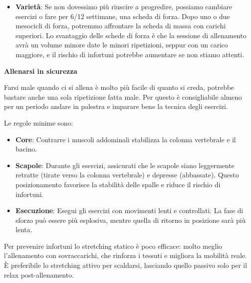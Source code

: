 \documentclass[12pt]{book} %
\begin{document}
\begin{itemize}
Non tutte le progressioni chiaramente sono facili allo stesso modo, nelle alzate laterali è più difficile che sulla pressa. Ad esempio se con le alzate fai 10kg e con la pressa 100kg, aumentare di 1kg o di una ripetizione, nella prima, rappresenterà una percentuale di progressione molto più alta.

Per sapere quando aumentare il carico in palestra, può essere uutile monitorare l'intensità usando il parametro RIR (Reps In Reserve), che misura le ripetizioni che si potrebbero ancora fare a fine serie. Per crescere in maniera sostenibile possiamo tenere 1-2 di RIR. Se il RIR è troppo alto (ad esempio 4-5), lo stimolo è insufficiente e bisogna aumentare il carico; se è costantemente a 0 RIR, si rischia di compromettere il recupero.

\item \textbf{Varietà}:
Se non dovessimo più riuscire a progredire, possiamo cambiare esercizi o fare per 6/12 settimane, una scheda di forza. Dopo uno o due mesocicli di forza, potremmo affrontare la scheda di massa con carichi superiori. Lo svantaggio delle schede di forza è che la sessione di allenamento avrà un volume minore date le minori ripetizioni, seppur con un carico maggiore, e il rischio di infortuni potrebbe aumentare se non stiamo attenti.
\end{itemize}

\textbf{Allenarsi in sicurezza}

Farsi male quando ci si allena è molto più facile di quanto si creda, potrebbe bastare anche una sola ripetizione fatta male. Per questo è consigliabile almeno per un periodo andare in palestra e imparare bene la tecnica degli esercizi.

Le regole minime sono:
\begin{itemize}
\item \textbf{Core}: Contrarre i muscoli addominali stabilizza la colonna vertebrale e il bacino.
\item \textbf{Scapole}: Durante gli esercizi, assicurati che le scapole siano leggermente retratte (tirate verso la colonna vertebrale) e depresse (abbassate). Questo posizionamento favorisce la stabilità delle spalle e riduce il rischio di infortuni.
\item \textbf{Esecuzione}: Esegui gli esercizi con movimenti lenti e controllati. La fase di sforzo può essere più esplosiva, mentre quella di ritorno in posizione sarà più lenta.
\end{itemize}

Per prevenire infortuni lo stretching statico è poco efficace: molto meglio l'allenamento con sovraccarichi, che rinforza i tessuti e migliora la mobilità reale. È preferibile lo stretching attivo per scaldarsi, lasciando quello passivo solo per il relax post-allenamento.
\end{document}
